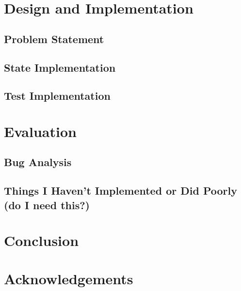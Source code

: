 \documentclass[letterpaper,12pt]{article}
\begin{document}
\section{Design and Implementation}

\subsection{Problem Statement}

\subsection{State Implementation}

\subsection{Test Implementation}

\section{Evaluation}

\subsection{Bug Analysis}

\subsection{Things I Haven't Implemented or Did Poorly (do I need this?)}

\section{Conclusion}

\section{Acknowledgements}


{\footnotesize 
}


\end{document}
